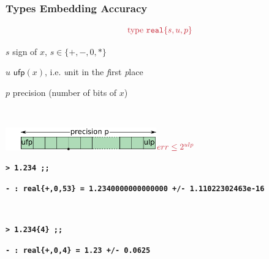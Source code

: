\documentclass[handout,t]{beamer}
\def\mytt#1{\texttt{\textbf{#1}}}
\def\real#1{real\{#1\}}
\begin{document}
\begin{frame}
\frametitle{Types Embedding Accuracy}



$$\color{red}
 \text{type}\    \mathtt{real\{}s,u,p\mathtt{\}}
$$

\vspace{-0.2cm}

$s$ sign of $x$, $s\in \{ +,-,0,*\}$

\vspace{0.2cm}

$u$ $\mathsf{ufp}(x)$, i.e. \textit{u}nit in the \textit{f}irst \textit{p}lace

\vspace{0.2cm}

$p$ precision (number of bits of $x$)

\vspace{0.4cm}

~\centerline{\includegraphics[width=6.5cm]{uflp.pdf}\hspace{1cm}$\color{red}err \le 2^{ulp}$}




\vspace{0.4cm}

\scriptsize\color{blue}
\mytt{> 1.234 ;;}

\mytt{- : \real{+,0,53} = 1.2340000000000000 +/- 1.11022302463e-16}

\mytt{\ }

\mytt{> 1.234\{4\} ;;}

\mytt{- : \real{+,0,4} = 1.23 +/- 0.0625}
\normalsize


\end{frame}
\end{document}
